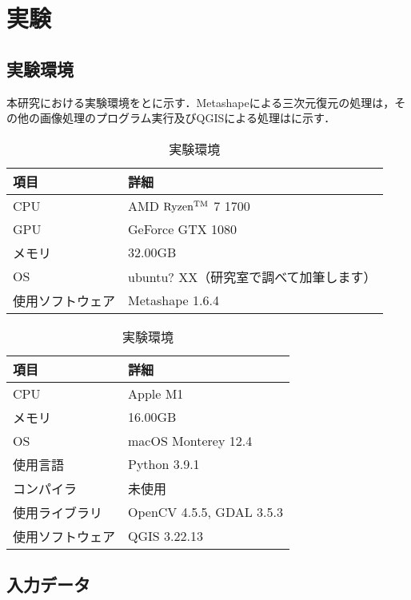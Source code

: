 \chapter{実験}
  \section{実験環境}
    本研究における実験環境をとに示す．Metashapeによる三次元復元の処理は，その他の画像処理のプログラム実行及びQGISによる処理はに示す．

    \begin{table}[t]
      \centering
      \caption{実験環境}
      \label{実験環境1}
      \begin{tabular}{ll}
        \hline
        \textbf{項目} & \textbf{詳細} \\
        \hline \hline
        CPU & AMD $\rm{Ryzen^{TM}}$ 7 1700 \\
        GPU & GeForce GTX 1080 \\
        メモリ & 32.00GB \\
        OS & ubuntu? XX（研究室で調べて加筆します） \\
        使用ソフトウェア & Metashape 1.6.4 \\ \hline 
      \end{tabular}
    \end{table}

    \begin{table}[t]
      \centering
      \caption{実験環境}
      \label{実験環境2}
      \begin{tabular}{ll}
        \hline
        \textbf{項目} & \textbf{詳細} \\
        \hline \hline
        CPU & Apple M1 \\
        メモリ & 16.00GB \\
        OS & macOS Monterey 12.4 \\
        使用言語 & Python 3.9.1 \\
        コンパイラ & 未使用 \\
        使用ライブラリ & OpenCV 4.5.5, GDAL 3.5.3 \\ 
        使用ソフトウェア & QGIS 3.22.13 \\ \hline 
      \end{tabular}
    \end{table}



  \section{入力データ}
    \label{入力データ（実験）}
